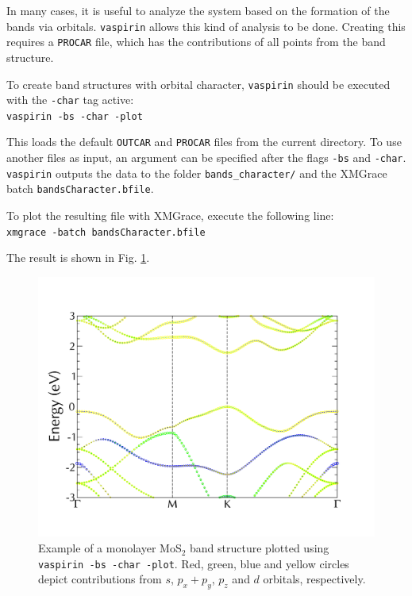\documentclass{refart}
\begin{document}
In many cases, it is useful to analyze the system based on the formation of the bands via orbitals. \texttt{vaspirin} allows this kind of analysis to be done. Creating this requires a \texttt{PROCAR} file, which has the contributions of all points from the band structure.

 To create band structures with orbital character, \texttt{vaspirin} should be executed with the \texttt{-char} tag active:\\
\texttt{vaspirin -bs -char -plot}

This loads the default \texttt{OUTCAR} and \texttt{PROCAR} files from the current directory. To use another files as input, an argument can be specified after the flags \texttt{-bs} and \texttt{-char}. \texttt{vaspirin} outputs the data to the folder \texttt{bands\_character/} and the XMGrace batch \texttt{bandsCharacter.bfile}.

 To plot the resulting file with XMGrace, execute the following line:\\
\texttt{xmgrace -batch bandsCharacter.bfile}

The result is shown in Fig. \ref{fig:bs-char}.

\begin{figure}[h!]
	\centering
	\includegraphics[width=\textwidth]{img/bs-char.pdf}
	\caption{Example of a monolayer MoS$_2$ band structure plotted using \texttt{vaspirin -bs -char -plot}. Red, green, blue and yellow circles depict contributions from $s$, $p_x + p_y$, $p_z$ and $d$ orbitals, respectively.}
	\label{fig:bs-char}
\end{figure}
\end{document}
